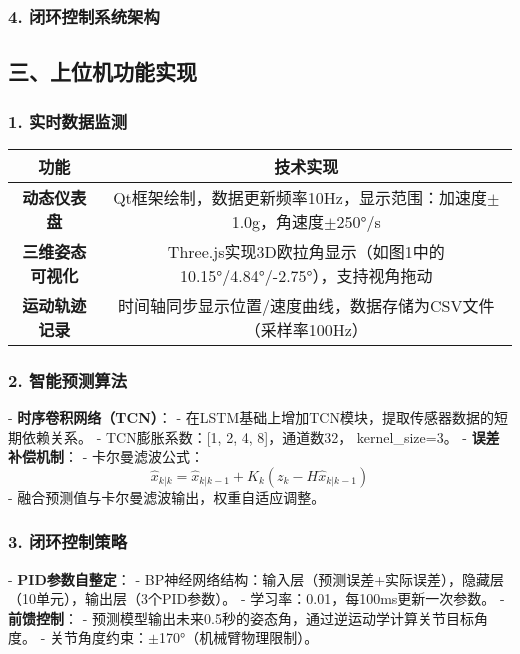 \documentclass[12pt, a4paper]{article}
\begin{document}
\subsubsection{4. 闭环控制系统架构}

\begin{center}
\end{center}

\subsection{三、上位机功能实现}

\subsubsection{1. 实时数据监测}

\begin{longtable}{|c|c|}
\hline
功能 & 技术实现 \\
\hline
\textbf{动态仪表盘} & Qt框架绘制，数据更新频率10Hz，显示范围：加速度$\pm$1.0g，角速度$\pm$250°/s \\
\hline
\textbf{三维姿态可视化} & Three.js实现3D欧拉角显示（如图1中的10.15°/4.84°/-2.75°），支持视角拖动 \\
\hline
\textbf{运动轨迹记录} & 时间轴同步显示位置/速度曲线，数据存储为CSV文件（采样率100Hz） \\
\hline
\end{longtable}

\subsubsection{2. 智能预测算法}
- \textbf{时序卷积网络（TCN）}：
  - 在LSTM基础上增加TCN模块，提取传感器数据的短期依赖关系。
  - TCN膨胀系数：[1, 2, 4, 8]，通道数32， kernel\_size=3。
- \textbf{误差补偿机制}：
  - 卡尔曼滤波公式：
  \begin{equation}
  \hat{x}_{k|k} = \hat{x}_{k|k-1} + K_k(z_k - H\hat{x}_{k|k-1})
  \end{equation}
  - 融合预测值与卡尔曼滤波输出，权重自适应调整。

\subsubsection{3. 闭环控制策略}
- \textbf{PID参数自整定}：
  - BP神经网络结构：输入层（预测误差+实际误差），隐藏层（10单元），输出层（3个PID参数）。
  - 学习率：0.01，每100ms更新一次参数。
- \textbf{前馈控制}：
  - 预测模型输出未来0.5秒的姿态角，通过逆运动学计算关节目标角度。
  - 关节角度约束：$\pm$170°（机械臂物理限制）。
\end{document}
